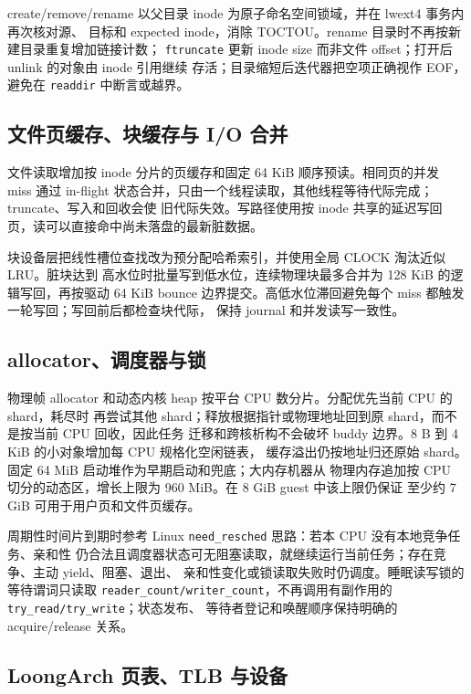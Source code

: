 \documentclass[UTF8,zihao=-4]{ctexart}
\newcommand{\code}{\nolinkurl}
\begin{document}
create/remove/rename 以父目录 inode 为原子命名空间锁域，并在 lwext4 事务内再次核对源、
目标和 expected inode，消除 TOCTOU。rename 目录时不再按新建目录重复增加链接计数；
\code{ftruncate} 更新 inode size 而非文件 offset；打开后 unlink 的对象由 inode 引用继续
存活；目录缩短后迭代器把空项正确视作 EOF，避免在 \code{readdir} 中断言或越界。

\subsection{文件页缓存、块缓存与 I/O 合并}

文件读取增加按 inode 分片的页缓存和固定 64 KiB 顺序预读。相同页的并发 miss 通过
in-flight 状态合并，只由一个线程读取，其他线程等待代际完成；truncate、写入和回收会使
旧代际失效。写路径使用按 inode 共享的延迟写回页，读可以直接命中尚未落盘的最新脏数据。

块设备层把线性槽位查找改为预分配哈希索引，并使用全局 CLOCK 淘汰近似 LRU。脏块达到
高水位时批量写到低水位，连续物理块最多合并为 128 KiB 的逻辑写回，再按驱动 64 KiB
bounce 边界提交。高低水位滞回避免每个 miss 都触发一轮写回；写回前后都检查块代际，
保持 journal 和并发读写一致性。

\subsection{allocator、调度器与锁}

物理帧 allocator 和动态内核 heap 按平台 CPU 数分片。分配优先当前 CPU 的 shard，耗尽时
再尝试其他 shard；释放根据指针或物理地址回到原 shard，而不是按当前 CPU 回收，因此任务
迁移和跨核析构不会破坏 buddy 边界。8 B 到 4 KiB 的小对象增加每 CPU 规格化空闲链表，
缓存溢出仍按地址归还原始 shard。固定 64 MiB 启动堆作为早期启动和兜底；大内存机器从
物理内存追加按 CPU 切分的动态区，增长上限为 960 MiB。在 8 GiB guest 中该上限仍保证
至少约 7 GiB 可用于用户页和文件页缓存。

周期性时间片到期时参考 Linux \code{need_resched} 思路：若本 CPU 没有本地竞争任务、亲和性
仍合法且调度器状态可无阻塞读取，就继续运行当前任务；存在竞争、主动 yield、阻塞、退出、
亲和性变化或锁读取失败时仍调度。睡眠读写锁的等待谓词只读取
\code{reader_count/writer_count}，不再调用有副作用的 \code{try_read/try_write}；状态发布、
等待者登记和唤醒顺序保持明确的 acquire/release 关系。

\subsection{LoongArch 页表、TLB 与设备}
\end{document}
